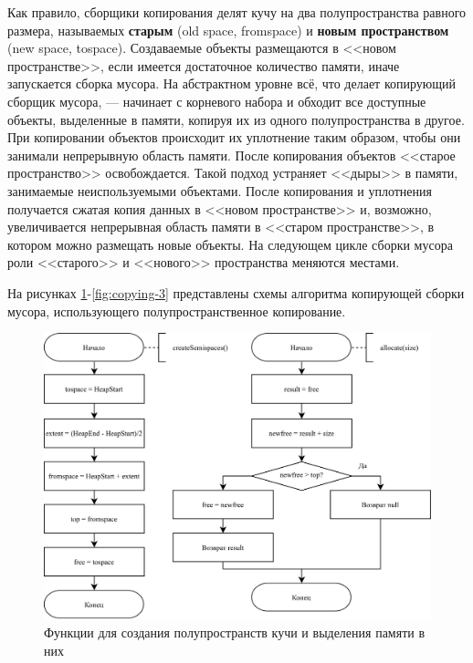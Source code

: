 Как правило, сборщики копирования делят кучу на два полупространства равного размера, называемых \textbf{старым} (old space, fromspace) и \textbf{новым пространством} (new space, tospace). Создаваемые объекты размещаются в <<новом пространстве>>, если имеется достаточное количество памяти, иначе запускается сборка мусора. На абстрактном уровне всё, что делает копирующий сборщик мусора, --- начинает с корневого набора и обходит все доступные объекты, выделенные в памяти, копируя их из одного полупространства в другое. При копировании объектов происходит их уплотнение таким образом, чтобы они занимали непрерывную область памяти. После копирования объектов <<старое пространство>> освобождается. Такой подход устраняет <<дыры>> в памяти, занимаемые неиспользуемыми объектами. После копирования и уплотнения получается сжатая копия данных в <<новом пространстве>> и, возможно, увеличивается непрерывная область памяти в <<старом пространстве>>, в котором можно размещать новые объекты. На следующем цикле сборки мусора роли <<старого>> и <<нового>> пространства меняются местами. \cite{handbook} \cite{cornell3}

На рисунках \ref{fig:copying-1}-\ref{fig:copying-3} представлены схемы алгоритма копирующей сборки мусора, использующего полупространственное копирование. \cite{handbook}

\begin{figure}[H]
	\centering
	\includegraphics[scale=0.175]{assets/copying-1.png}
	\caption{Функции для создания полупространств кучи и выделения памяти в них}
	\label{fig:copying-1}
\end{figure}

